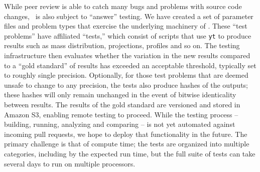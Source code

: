 While peer review is able to catch many bugs and problems with source
code changes, \enzo\ is also subject to ``answer'' testing.  We have
created a set of parameter files and problem types that exercise the
underlying machinery of \enzo.  These ``test problems'' have
affiliated ``tests,'' which consist of scripts that use \texttt{yt}
\citep{2011ApJS..192....9T} to produce results such as mass
distribution, projections, profiles and so on.  The testing
infrastructure then evaluates whether the variation in the new results
compared to a ``gold standard'' of results has exceeded an acceptable
threshold, typically set to roughly single precision.  Optionally, for
those test problems that are deemed unsafe to change to any precision,
the tests also produce hashes of the outputs; these hashes will only
remain unchanged in the event of bitwise identicality between results.
The results of the gold standard are versioned and stored in Amazon
S3, enabling remote testing to proceed.  While the testing process --
building, running, analyzing and comparing -- is not yet automated
against incoming pull requests, we hope to deploy that functionality
in the future.  The primary challenge is that of compute time; the
tests are organized into multiple categories, including by the
expected run time, but the full suite of tests can take several days
to run on multiple processors.
